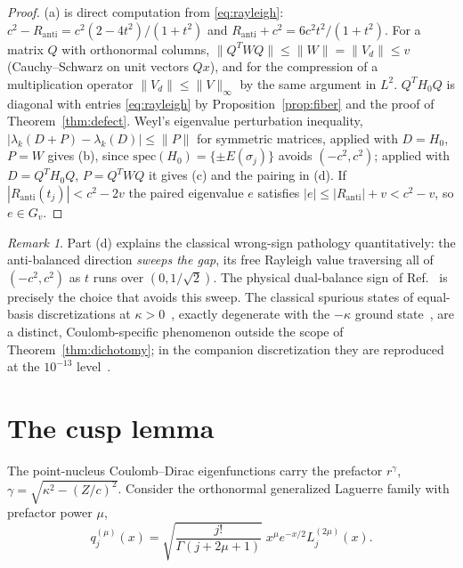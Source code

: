 \documentclass[11pt,reqno]{amsart}
\theoremstyle{definition}
\theoremstyle{remark}
\newtheorem{remark}[theorem]{Remark}
\newcommand{\norm}[1]{\lVert #1\rVert}
\begin{document}
\begin{proof}
(a) is direct computation from \eqref{eq:rayleigh}:
$c^{2}-R_{\mathrm{anti}}=c^{2}(2-4t^{2})/(1+t^{2})$ and
$R_{\mathrm{anti}}+c^{2}=6c^{2}t^{2}/(1+t^{2})$.
For a matrix $Q$ with orthonormal columns,
$\norm{Q^{T}WQ}\le\norm{W}=\norm{V_{d}}\le v$ (Cauchy--Schwarz on unit
vectors $Qx$), and for the compression of a multiplication operator
$\norm{V_{d}}\le\norm{V}_{\infty}$ by the same argument in $L^{2}$.
$Q^{T}H_{0}Q$ is diagonal with entries \eqref{eq:rayleigh} by
Proposition~\ref{prop:fiber} and the proof of
Theorem~\ref{thm:defect}. Weyl's eigenvalue perturbation inequality,
$|\lambda_{k}(D+P)-\lambda_{k}(D)|\le\norm{P}$ for symmetric matrices,
applied with $D=H_{0}$, $P=W$ gives (b), since
$\mathrm{spec}(H_{0})=\{\pm E(\sigma_{j})\}$ avoids $(-c^{2},c^{2})$;
applied with $D=Q^{T}H_{0}Q$, $P=Q^{T}WQ$ it gives (c) and the pairing
in (d). If $|R_{\mathrm{anti}}(t_{j})|<c^{2}-2v$ the paired eigenvalue
$e$ satisfies $|e|\le|R_{\mathrm{anti}}|+v<c^{2}-v$, so $e\in G_{v}$.
\end{proof}

\begin{remark}
Part (d) explains the classical wrong-sign pathology quantitatively:
the anti-balanced direction \emph{sweeps the gap}, its free Rayleigh
value traversing all of $(-c^{2},c^{2})$ as $t$ runs over
$(0,1/\sqrt{2})$. The physical dual-balance sign of
Ref.~\cite{Shabaev2004} is precisely the choice that avoids this sweep.
The classical spurious states of equal-basis discretizations at
$\kappa>0$~\cite{DrakeGoldman1981,Pestka2003}, exactly degenerate with
the $-\kappa$ ground state~\cite{Tupitsyn2008}, are a distinct,
Coulomb-specific phenomenon outside the scope of
Theorem~\ref{thm:dichotomy}; in the companion discretization they are
reproduced at the $10^{-13}$ level~\cite{companion}.
\end{remark}

\section{The cusp lemma}\label{sec:cusp}

The point-nucleus Coulomb--Dirac eigenfunctions carry the prefactor
$r^{\gamma}$, $\gamma=\sqrt{\kappa^{2}-(Z/c)^{2}}$. Consider the
orthonormal generalized Laguerre family with prefactor power $\mu$,
\begin{equation}
q_{j}^{(\mu)}(x)=\sqrt{\frac{j!}{\Gamma(j+2\mu+1)}}\;
x^{\mu}e^{-x/2}L_{j}^{(2\mu)}(x).
\label{eq:qj}
\end{equation}
\end{document}
